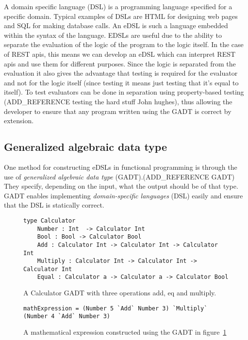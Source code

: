 A domain specific language (DSL) is a programming language specified for a
specific domain. Typical examples of DSLs are HTML for designing web pages and
SQL for making database calls. An eDSL is such a language embedded within the
syntax of the language. EDSLs are useful due to the ability to separate the
evaluation of the logic of the program to the logic itself. In the case of REST
apis, this means we can develop an eDSL which can interpret REST apis and use
them for different purposes. Since the logic is separated from the evaluation it
also gives the advantage that testing is required for the evaluator and not for
the logic itself (since testing it means just testing that it's equal to
itself). To test evaluators can be done in separation using property-based
testing (ADD\_REFERENCE testing the hard stuff John hughes), thus allowing the
developer to ensure that any program written using the GADT is correct by
extension.

\subsection{Generalized algebraic data type}\label{gadt}

One method for constructing eDSLs in functional programming is through the use
of \textit{generalized algebraic data type} (GADT).(ADD\_REFERENCE GADT)  They
specify, depending on the input, what the output should be of that type. GADT
enables implementing \textit{domain-specific languages} (DSL) easily and ensure
that the DSL is statically correct. 

\begin{figure}[H]
    \begin{lstlisting}
type Calculator 
    Number : Int  -> Calculator Int
    Bool : Bool -> Calculator Bool
    Add : Calculator Int -> Calculator Int -> Calculator Int
    Multiply : Calculator Int -> Calculator Int -> Calculator Int
    Equal : Calculator a -> Calculator a -> Calculator Bool
    \end{lstlisting}
    \caption{A Calculator GADT with three operations add, eq and multiply.}
    \label{gadtcalculator}
\end{figure}

\begin{figure}[H]
    \begin{lstlisting}
mathExpression = (Number 5 `Add` Number 3) `Multiply` (Number 4 `Add` Number 3)
    \end{lstlisting}
    \caption{A mathematical expression constructed using the GADT in
    figure~\ref{gadtcalculator}}
    \label{mathexpressiongadt}
\end{figure}


